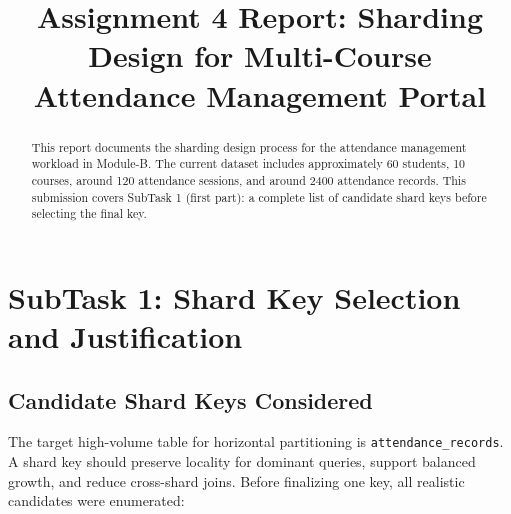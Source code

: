 \documentclass[conference]{IEEEtran}
\begin{document}
\title{Assignment 4 Report: Sharding Design for Multi-Course Attendance Management Portal}

\author{
}

\maketitle

\begin{abstract}
This report documents the sharding design process for the attendance management workload in Module-B. The current dataset includes approximately 60 students, 10 courses, around 120 attendance sessions, and around 2400 attendance records. This submission covers SubTask 1 (first part): a complete list of candidate shard keys before selecting the final key.
\end{abstract}

\section{SubTask 1: Shard Key Selection and Justification}

\subsection{Candidate Shard Keys Considered}
The target high-volume table for horizontal partitioning is \texttt{attendance\_records}. A shard key should preserve locality for dominant queries, support balanced growth, and reduce cross-shard joins. Before finalizing one key, all realistic candidates were enumerated:
\end{document}

